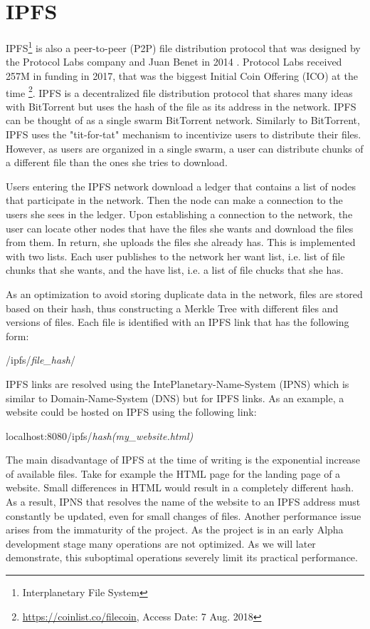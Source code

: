 {\section{IPFS}{
IPFS\footnote{Interplanetary File System} is also a peer-to-peer (P2P) file distribution protocol that was designed by the Protocol Labs company and 
Juan Benet in 2014 \cite{benet2014ipfs}. Protocol Labs received 257M in funding in 2017, that was the biggest Initial Coin Offering (ICO) at the time \footnote{\url{https://coinlist.co/filecoin}, Access Date: 7 Aug. 2018}. IPFS is a decentralized file distribution protocol that shares many ideas with BitTorrent but uses the hash of the file as its address in the network. IPFS can be thought of as a single swarm BitTorrent network. Similarly to BitTorrent, IPFS uses the "tit-for-tat" mechanism to incentivize users to distribute their files. However, as users are organized in a single swarm, a user can distribute chunks of a different file than the ones she tries to download.

Users entering the IPFS network download a ledger that contains a list of nodes that participate in the network. Then the node can make a connection to the users she sees in the ledger. Upon establishing a connection to the network, the user can locate other nodes that have the files she wants and download the files from them. In return, she uploads the files she already has. This is implemented with two lists. Each user publishes to the network her want list, i.e. list of file chunks that she wants, and the have list, i.e. a list of file chucks that she has.

As an optimization to avoid storing duplicate data in the network, files are stored based on their hash, thus constructing a Merkle Tree \cite{MerkleTrees} with different files and versions of files. Each file is identified with an IPFS link that has the following form:
\begin{center}
/ipfs/\textit{file\_hash}/
\end{center}
IPFS links are resolved using the IntePlanetary-Name-System (IPNS) which is similar to Domain-Name-System (DNS) but for IPFS links. As an example, a website could be hosted on IPFS using the following link:

\begin{center}
localhost:8080/ipfs/\textit{hash(my\_website.html)} 
\end{center}


The main disadvantage of IPFS at the time of writing is the exponential increase of available files. Take for example the HTML page for the landing page of a website. Small differences in HTML would result in a completely different hash. As a result, IPNS that resolves the name of the website to an IPFS address must constantly be updated, even for small changes of files. Another performance issue arises from the immaturity of the project. As the project is in an early Alpha development stage many operations are not optimized. As we will later demonstrate, this suboptimal operations severely limit its practical performance.
}

}

